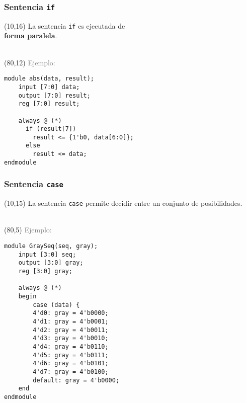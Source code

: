 \documentclass[aspectratio=169]{beamer}
\begin{document}
\begin{frame}[fragile,t]
    \frametitle{Sentencia \texttt{if}}
    \begin{textblock}{65}(10,16)
    La sentencia \texttt{if} es ejecutada de\\ \textbf{forma paralela}.\\
    \bigskip
    \\
    \bigskip
    \end{textblock}
    \begin{textblock}{70}(80,12)
    \textcolor{gray}{Ejemplo:}\\
\begin{lstlisting}
module abs(data, result);
    input [7:0] data;
    output [7:0] result;
    reg [7:0] result;

    always @ (*)
      if (result[7])
        result <= {1'b0, data[6:0]};
      else
        result <= data;
endmodule
\end{lstlisting}
    \end{textblock}
\end{frame}

\begin{frame}[fragile,t]
    \frametitle{Sentencia \texttt{case}}
    \begin{textblock}{60}(10,15)
    La sentencia \texttt{case} permite decidir entre un conjunto de posibilidades.\\
    \bigskip
    \\
    \bigskip
    \end{textblock}
    \begin{textblock}{65}(80,5)
    \textcolor{gray}{Ejemplo:}\\
\begin{lstlisting}
module GraySeq(seq, gray);
    input [3:0] seq;
    output [3:0] gray;
    reg [3:0] gray;

    always @ (*)
    begin
        case (data) {
        4'd0: gray = 4'b0000;
        4'd1: gray = 4'b0001;
        4'd2: gray = 4'b0011;
        4'd3: gray = 4'b0010;
        4'd4: gray = 4'b0110;
        4'd5: gray = 4'b0111;
        4'd6: gray = 4'b0101;
        4'd7: gray = 4'b0100;
        default: gray = 4'b0000;
    end
endmodule
\end{lstlisting}
    \end{textblock}
\end{frame}
\end{document}
